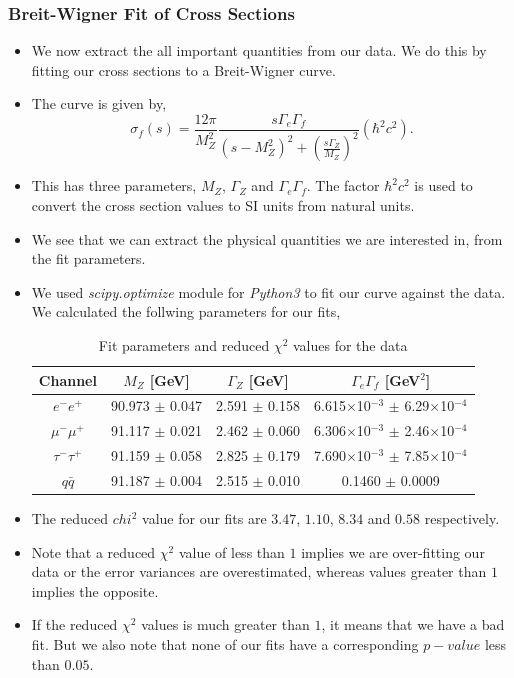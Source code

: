 \documentclass[10pt]{beamer}
\begin{document}
\begin{frame}
\frametitle{Breit-Wigner Fit of Cross Sections}
\begin{itemize}
  \item We now extract the all important quantities from our data. We do this by fitting our cross sections to a Breit-Wigner curve.
  \item The curve is given by,
  \begin{equation}
    \sigma_f (s) = \frac{12\pi}{M_Z^2} \frac{s \Gamma_e \Gamma_f}{(s-M_Z^2)^2 + \left(\frac{s\Gamma_Z}{M_Z}\right)^2} (\hbar^2 c^2).
  \end{equation}
  \item This has three parameters, $M_Z$, $\Gamma_Z$ and $\Gamma_e\Gamma_f$. The factor $\hbar^2 c^2$ is used to convert the cross section values to SI units from natural units.
  \item We see that we can extract the physical quantities we are interested in, from the fit parameters.
  \item We used \textit{scipy.optimize} module for \textit{Python3} to fit our curve against the data. We calculated the follwing parameters for our fits,
  \begin{table}[h!]
    \centering
    \begin{tabular}{c|ccc}
    \hline
    Channel        & $M_Z$ {[}GeV{]}    & $\Gamma_Z$ {[}GeV{]} & $\Gamma_e\Gamma_f$ {[}GeV$^2${]}                    \\ \hline
    $e^-e^+$       & 90.973 $\pm$ 0.047 & 2.591 $\pm$ 0.158    & 6.615$\times$10$^{-3}$ $\pm$ 6.29$\times$10$^{-4}$ \\
    $\mu^-\mu^+$   & 91.117 $\pm$ 0.021 & 2.462 $\pm$ 0.060    & 6.306$\times$10$^{-3}$ $\pm$ 2.46$\times$10$^{-4}$ \\
    $\tau^-\tau^+$ & 91.159 $\pm$ 0.058 & 2.825 $\pm$ 0.179    & 7.690$\times$10$^{-3}$ $\pm$ 7.85$\times$10$^{-4}$ \\
    $q\bar{q}$     & 91.187 $\pm$ 0.004 & 2.515 $\pm$ 0.010    & 0.1460 $\pm$ 0.0009                                \\ \hline
    \end{tabular}
    \caption{Fit parameters and reduced $\chi^2$ values for the data}
    \label{table:bwfit}
  \end{table}
\end{itemize}
\end{frame}

\begin{frame}
\begin{itemize}
  \item The reduced $chi^2$ value for our fits are $3.47$, $1.10$, $8.34$ and $0.58$ respectively.
  \item Note that a reduced $\chi^2$ value of less than $1$ implies we are over-fitting our data or the error variances are overestimated, whereas values greater than $1$ implies the opposite.
  \item If the reduced $\chi^2$ values is much greater than $1$, it means that we have a bad fit. But we also note that none of our fits have a corresponding $p-value$ less than $0.05$.
\end{itemize}
\end{frame}
\end{document}
